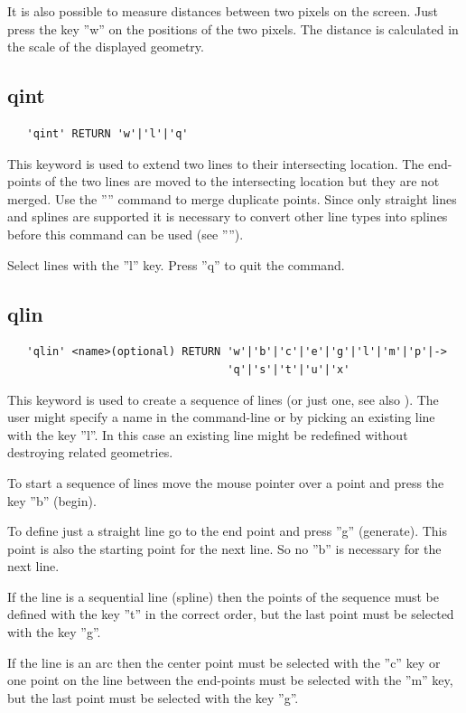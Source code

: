 \documentclass{article}
\begin{document}
It is also possible to measure distances between two pixels on the screen. Just press the key ''w'' on the positions of the two pixels. The distance is calculated in the scale of the displayed geometry.

\subsection{\label{qint}qint}
\begin{verbatim}
   'qint' RETURN 'w'|'l'|'q'
\end{verbatim}
This keyword is used to extend two lines to their intersecting location. The end-points of the two lines are moved to the intersecting location but they are not merged. Use the '''' command to merge duplicate points. Since only straight lines and splines are supported it is necessary to convert other line types into splines before this command can be used (see '''').

Select lines with the ''l'' key. Press ''q'' to quit the command.

\subsection{\label{qlin}qlin}
\begin{verbatim}
   'qlin' <name>(optional) RETURN 'w'|'b'|'c'|'e'|'g'|'l'|'m'|'p'|->
                                  'q'|'s'|'t'|'u'|'x'
\end{verbatim}
This keyword is used to create a sequence of lines (or just one, see also ). The user might specify a name in the command-line or by picking an existing line with the key ''l''. In this case an existing line might be redefined without destroying related geometries.

To start a sequence of lines move the mouse pointer over a point and press the key ''b'' (begin).

To define just a straight line go to the end point and press ''g'' (generate). This point is also the starting point for the next line. So no ''b'' is necessary for the next line.

If the line is a sequential line (spline) then the points of the sequence must be defined with the key ''t'' in the correct order, but the last point must be selected with the key ''g''.

If the line is an arc then the center point must be selected with the ''c'' key or one point on the line between the end-points must be selected with the ''m'' key, but the last point must be selected with the key ''g''.
\end{document}
